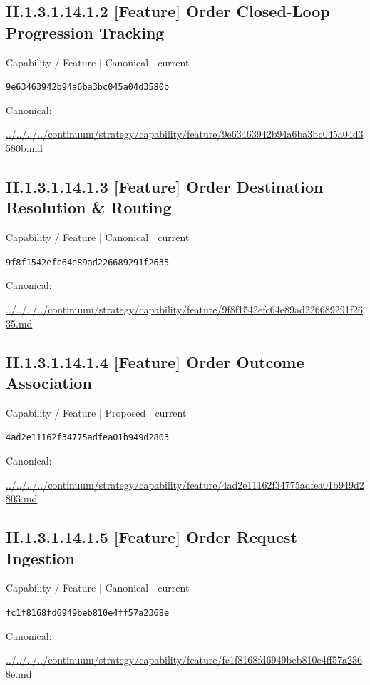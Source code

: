 \documentclass[10pt,a4paper]{article}
\begin{document}
\subsection*{II.1.3.1.14.1.2 [Feature] Order Closed-Loop Progression Tracking}
{\small Capability / Feature | Canonical | current}\par
\texttt{9e63463942b94a6ba3bc045a04d3580b}\par
Canonical: \par
{\footnotesize\url{../../../../continuum/strategy/capability/feature/9e63463942b94a6ba3bc045a04d3580b.md}}\par
\subsection*{II.1.3.1.14.1.3 [Feature] Order Destination Resolution \& Routing}
{\small Capability / Feature | Canonical | current}\par
\texttt{9f8f1542efc64e89ad226689291f2635}\par
Canonical: \par
{\footnotesize\url{../../../../continuum/strategy/capability/feature/9f8f1542efc64e89ad226689291f2635.md}}\par
\subsection*{II.1.3.1.14.1.4 [Feature] Order Outcome Association}
{\small Capability / Feature | Proposed | current}\par
\texttt{4ad2e11162f34775adfea01b949d2803}\par
Canonical: \par
{\footnotesize\url{../../../../continuum/strategy/capability/feature/4ad2e11162f34775adfea01b949d2803.md}}\par
\subsection*{II.1.3.1.14.1.5 [Feature] Order Request Ingestion}
{\small Capability / Feature | Canonical | current}\par
\texttt{fc1f8168fd6949beb810e4ff57a2368e}\par
Canonical: \par
{\footnotesize\url{../../../../continuum/strategy/capability/feature/fc1f8168fd6949beb810e4ff57a2368e.md}}\par
\end{document}
